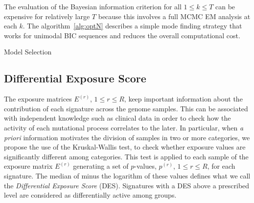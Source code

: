 \documentclass{bioinfo}
\makeatletter
\def\BState{\State\hskip-\ALG@thistlm}
\makeatother
\begin{document}
The evaluation of the Bayesian information criterion for all
$1\leq k \leq T$ can be expensive for relatively large $T$
because this involves a full MCMC EM analysis at each $k$. The
algorithm~\ref{alg:optN} describes a simple mode finding strategy that 
works for unimodal BIC sequences and reduces the overall computational
cost.  



\begin{algorithm}
\caption{Model Selection}\label{alg:optN}
\end{algorithm}

\subsection{Differential Exposure Score}\label{sec:DES}
The exposure matrices $E^{(r)}$, $1 \leq r \leq R$, keep important
information about the contribution of each signature across the genome
samples. This can be associated with independent knowledge such as
clinical data in order to check how the activity of each mutational
process correlates to the later. In particular, when \emph{a priori}
information motivates the division of samples in two or more
categories, we propose the use of the Kruskal-Wallis test, to check
whether exposure values are significantly different among
categories. This test is applied to each sample of the exposure matrix
$E^{(r)}$ generating a set of $p$-values, $p^{(r)}$, $1 \leq r \leq
R$, for each signature. The median of minus the logarithm of these
values defines what we call the \emph{Differential Exposure Score}
(DES). Signatures with a DES above a prescribed level are considered
as differentially active among groups.
\end{document}
